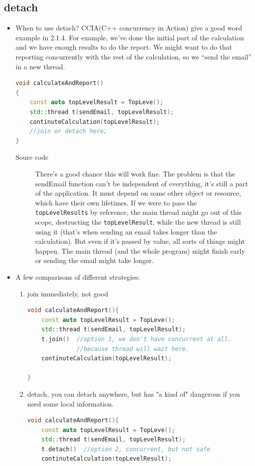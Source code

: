 \documentclass[a4paper,11pt,twoside]{book}
\begin{document}
\subsection{detach}

\begin{itemize}
	\item When to use detach? CCIA(C++ concurrency in Action) give a good word example in 2.1.4. For example, we’ve done the initial part of the calculation and we have enough results to do the report. We might want to do that reporting concurrently with the rest of the calculation, so we “send the email” in a new thread.
\begin{lstlisting}[frame=single, language=c++]
void calculateAndReport()
{
	const auto topLevelResult = TopLeve();
	std::thread t(sendEmail, topLevelResult);
	continuteCalculation(topLevelResult);
	//join or detach here;
}
\end{lstlisting}	

\begin{description}
	\item[Soure code]  There’s a good chance this will work fine. The problem is that the sendEmail function can’t be independent of everything, it’s still a part of the application. It must depend on some other object or resource, which have their own lifetimes. If we were to pass the \texttt{topLevelResults} by reference, the main thread might go out of this scope, destructing the \texttt{topLevelResult}, while the new thread is still using it (that’s when sending an email takes longer than the calculation). But even if it’s passed by value, all sorts of things might happen. The main thread (and the whole program) might finish early or sending the email might take longer.
\end{description}

	\item A few comparisons of different strategies:
	\begin{enumerate}
		\item join immediately, not good
\begin{lstlisting}[frame=single, language=c++]
void calculateAndReport(){
	const auto topLevelResult = TopLeve();
	std::thread t(sendEmail, topLevelResult);
	t.join()  //option 1, we don't have concurrent at all. 
	          //because thread will wait here.
	continuteCalculation(topLevelResult);
	
}		
\end{lstlisting}	
		\item detach, you can detach anywhere, but has "a kind of" dangerous if you need some local information. 
\begin{lstlisting}[frame=single, language=c++]
void calculateAndReport(){
	const auto topLevelResult = TopLeve();
	std::thread t(sendEmail, topLevelResult);
	t.detach()  //option 2, concurrent, but not safe 
	continuteCalculation(topLevelResult);
	

\end{lstlisting}
\end{enumerate}
\end{itemize}
\end{document}

